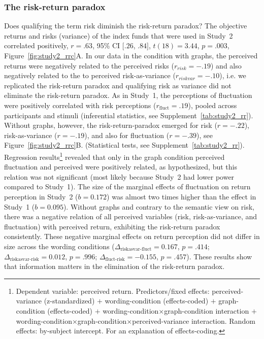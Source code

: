 \documentclass[a4paper,man, natbib,floatsintext]{apa6} %
\begin{document}
\subsubsection{The risk-return paradox}
Does qualifying the term risk diminish the risk-return paradox? The objective returns and risks (variance) of the index funds that were used in Study~2 correlated positively, $r = .63$, 95\% CI $[.26$, $.84]$, $t(18) = 3.44$, $p = .003$, Figure~\ref{fig:study2_rrc}A. In our data in the condition with graphs, the perceived returns were negatively related to the perceived risks  ($r_{risk} = -.19$) and also negatively related to the to perceived risk-as-variance ($r_{riskvar}=-.10$), i.e. we replicated the risk-return paradox and qualifying risk as variance did not eliminate the risk-return paradox. As in Study~1, the perceptions of fluctuation were positively correlated with risk perceptions ($r_{\text{fluct}} = .19$), pooled across participants and stimuli (inferential statistics, see Supplement~\ref{tab:study2_rr}). Without graphs, however, the risk-return-paradox emerged for risk ($r = -.22$), risk-as-variance ($r= -.19$), and also for fluctuation ($r=-.39$), see Figure~\ref{fig:study2_rrc}B. (Statistical tests, see Supplement~\ref{tab:study2_rr}). Regression results\footnote{Dependent variable: perceived return. Predictors/fixed effects: perceived-variance (z-standardized) $+$ wording-condition (effects-coded) $+$ graph-condition (effects-coded) $+$ wording-condition$\times$graph-condition interaction $+$ wording-condition$\times$graph-condition$\times$perceived-variance interaction. Random effects: by-subject intercept. For an explanation of effects-coding.} revealed that only in the graph condition perceived fluctuation and perceived were positively related, as hypothesized, but this relation was not significant (most likely because Study~2 had lower power compared to Study~1). The size of the marginal effects of fluctuation on return perception in Study~2 ($b=0.172$) was almost two times higher than the effect in Study~1 ($b=0.095$). 
Without graphs and contrary to the semantic view on risk, there was a negative relation of all perceived variables (risk, risk-as-variance, and fluctuation) with perceived return, exhibiting the risk-return paradox consistently. These negative marginal effects on return perception did not differ in size across the wording conditions ($\Delta_{\text{riskasvar-fluct}}=0.167$, $p=.414$; $\Delta_{\text{riskasvar-risk}}=0.012$, $p=.996$; $\Delta_{\text{fluct-risk}}=-0.155$, $p=.457$). These results show that information matters in the elimination of the risk-return paradox.
\end{document}
